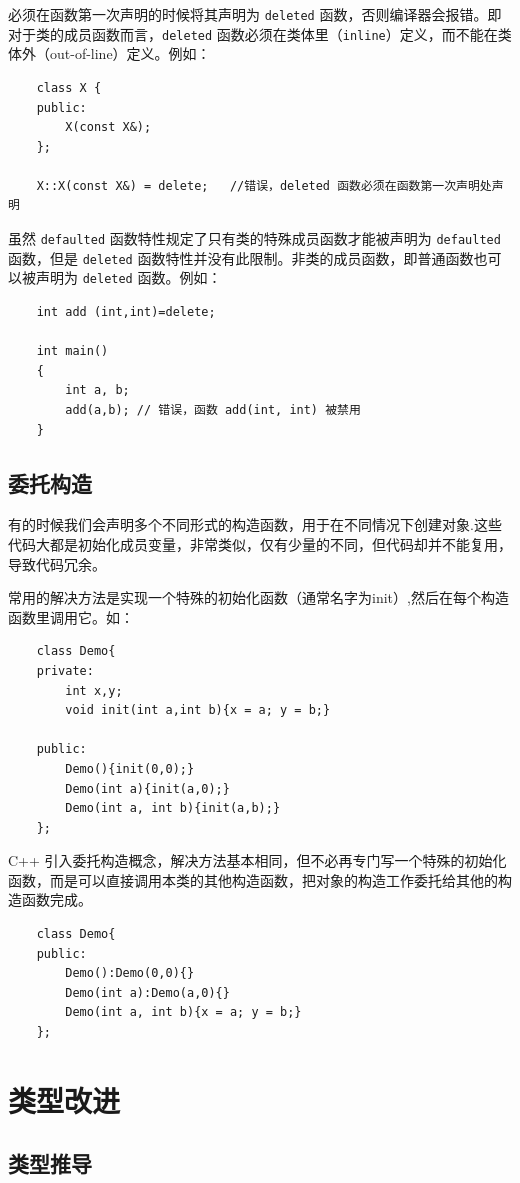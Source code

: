 \documentclass[UTF8,a4paper,12pt]{ctexbook} %
\begin{document}
				必须在函数第一次声明的时候将其声明为 \verb|deleted| 函数，否则编译器会报错。即对于类的成员函数而言，\verb|deleted| 函数必须在类体里（\verb|inline|）定义，而不能在类体外（out-of-line）定义。例如：
					\begin{lstlisting}
	class X { 
	public:  
		X(const X&); 
	}; 
	
	X::X(const X&) = delete;   //错误，deleted 函数必须在函数第一次声明处声明						
					\end{lstlisting}
				
				虽然 \verb|defaulted| 函数特性规定了只有类的特殊成员函数才能被声明为 \verb|defaulted| 函数，但是 \verb|deleted| 函数特性并没有此限制。非类的成员函数，即普通函数也可以被声明为 \verb|deleted| 函数。例如：
					\begin{lstlisting}
	int add (int,int)=delete; 
	
	int main()
	{ 
		int a, b; 
		add(a,b); // 错误，函数 add(int, int) 被禁用
	}					
					\end{lstlisting}
				
				
		\subsection{委托构造}
			有的时候我们会声明多个不同形式的构造函数，用于在不同情况下创建对象.这些代码大都是初始化成员变量，非常类似，仅有少量的不同，但代码却并不能复用，导致代码冗余。
			
			常用的解决方法是实现一个特殊的初始化函数（通常名字为init）,然后在每个构造函数里调用它。如：
				\begin{lstlisting}
	class Demo{
	private:
		int x,y;
		void init(int a,int b){x = a; y = b;}
	
	public:
		Demo(){init(0,0);}
		Demo(int a){init(a,0);}
		Demo(int a, int b){init(a,b);}
	};				
				\end{lstlisting}
			
			C++ 引入委托构造概念，解决方法基本相同，但不必再专门写一个特殊的初始化函数，而是可以直接调用本类的其他构造函数，把对象的构造工作委托给其他的构造函数完成。
				\begin{lstlisting}
	class Demo{
	public:
		Demo():Demo(0,0){}
		Demo(int a):Demo(a,0){}
		Demo(int a, int b){x = a; y = b;}
	};				
				\end{lstlisting}
	
	\section{类型改进}
		\subsection{类型推导}
\end{document}
